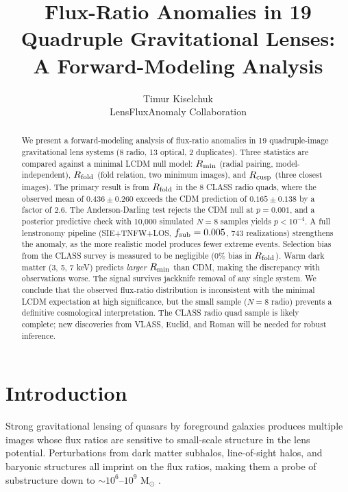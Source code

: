 \documentclass[12pt]{article}
\newcommand{\rfold}{\ensuremath{R_{\rm fold}}}
\newcommand{\rcusp}{\ensuremath{R_{\rm cusp}}}
\newcommand{\rmin}{\ensuremath{R_{\rm min}}}
\newcommand{\lcdm}{LCDM}
\begin{document}
\title{Flux-Ratio Anomalies in 19 Quadruple Gravitational Lenses: \\
A Forward-Modeling Analysis}

\author{Timur Kiselchuk \\ LensFluxAnomaly Collaboration}
\date{}

\maketitle

\begin{abstract}
We present a forward-modeling analysis of flux-ratio anomalies in 19 quadruple-image
gravitational lens systems (8 radio, 13 optical, 2 duplicates).
Three statistics are compared against a minimal \lcdm{} null model:
\rmin{} (radial pairing, model-independent), \rfold{} (fold relation, two minimum images),
and \rcusp{} (three closest images).
The primary result is from \rfold{} in the 8 CLASS radio quads, where the observed mean of
$0.436 \pm 0.260$ exceeds the CDM prediction of $0.165 \pm 0.138$ by a factor of 2.6.
The Anderson-Darling test rejects the CDM null at $p = 0.001$, and a posterior predictive
check with 10,000 simulated $N=8$ samples yields $p < 10^{-4}$.
A full lenstronomy pipeline (SIE+TNFW+LOS, $f_{\rm sub}=0.005$, 743 realizations)
strengthens the anomaly, as the more realistic model produces fewer extreme events.
Selection bias from the CLASS survey is measured to be negligible (0\% bias in \rfold{}).
Warm dark matter (3, 5, 7 keV) predicts \emph{larger} \rmin{} than CDM, making the
discrepancy with observations worse.
The signal survives jackknife removal of any single system.
We conclude that the observed flux-ratio distribution is inconsistent with the minimal
\lcdm{} expectation at high significance, but the small sample ($N=8$ radio) prevents
a definitive cosmological interpretation. The CLASS radio quad sample is likely complete;
new discoveries from VLASS, Euclid, and Roman will be needed for robust inference.
\end{abstract}

\section{Introduction}
\label{sec:intro}

Strong gravitational lensing of quasars by foreground galaxies produces multiple images
whose flux ratios are sensitive to small-scale structure in the lens potential.
Perturbations from dark matter subhalos, line-of-sight halos, and baryonic structures
all imprint on the flux ratios, making them a probe of substructure down to
$\sim 10^6$--$10^9$ M$_\odot$ \cite{DalalKochanek2002, MetcalfMadau2001, Chiba2002}.
\end{document}

